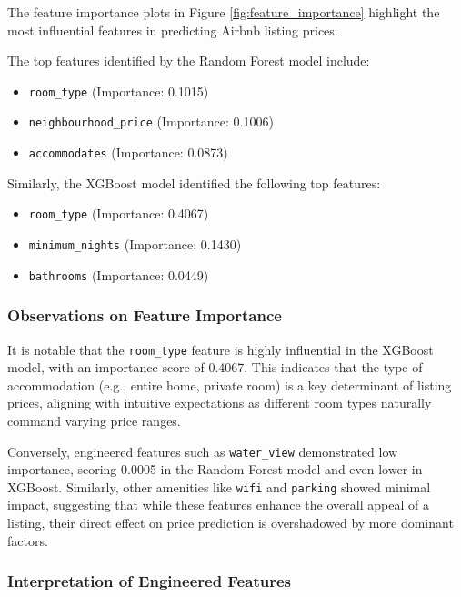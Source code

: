 \documentclass[12pt]{article}
\begin{document}
The feature importance plots in Figure \ref{fig:feature_importance} highlight the most influential features in predicting Airbnb listing prices.

The top features identified by the Random Forest model include:

\begin{itemize}
    \item \texttt{room\_type} (Importance: 0.1015)
    \item \texttt{neighbourhood\_price} (Importance: 0.1006)
    \item \texttt{accommodates} (Importance: 0.0873)
\end{itemize}

Similarly, the XGBoost model identified the following top features:

\begin{itemize}
    \item \texttt{room\_type} (Importance: 0.4067)
    \item \texttt{minimum\_nights} (Importance: 0.1430)
    \item \texttt{bathrooms} (Importance: 0.0449)
\end{itemize}

\subsubsection{Observations on Feature Importance}

It is notable that the \texttt{room\_type} feature is highly influential in the XGBoost model, with an importance score of 0.4067. This indicates that the type of accommodation (e.g., entire home, private room) is a key determinant of listing prices, aligning with intuitive expectations as different room types naturally command varying price ranges.

Conversely, engineered features such as \texttt{water\_view} demonstrated low importance, scoring 0.0005 in the Random Forest model and even lower in XGBoost. Similarly, other amenities like \texttt{wifi} and \texttt{parking} showed minimal impact, suggesting that while these features enhance the overall appeal of a listing, their direct effect on price prediction is overshadowed by more dominant factors.

\subsubsection{Interpretation of Engineered Features}
\end{document}
